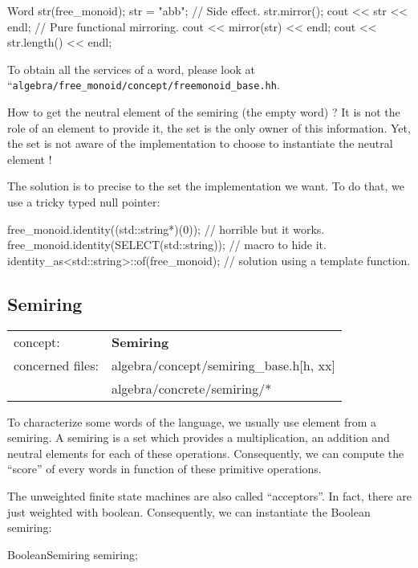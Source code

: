 \documentclass{article}
\begin{document}
\begin{code}
  Word str(free_monoid);
  str = "abb";
  // Side effect.
  str.mirror();
  cout << str << endl;
  // Pure functional mirroring.
  cout << mirror(str) << endl;
  cout << str.length() << endl;
\end{code}

To obtain all the services of a word, please look at
``\verb!algebra/free_monoid/concept/freemonoid_base.hh!.

How to get the neutral element of the semiring (the empty word) ? It
is not the role of an element to provide it, the set is the only owner
of this information. Yet, the set is not aware of the implementation
to choose to instantiate the neutral element ! 

The solution is to precise to the set the implementation we want. To
do that, we use a tricky typed null pointer:

\begin{code}
free_monoid.identity((std::string*)(0));   // horrible but it works.
free_monoid.identity(SELECT(std::string)); // macro to hide it.
identity_as<std::string>::of(free_monoid); // solution using a template function.
\end{code}

\subsection{Semiring}

\begin{tabular}%
{ll}
\hline 
concept: & \textbf{Semiring}  \\
concerned files: & algebra/concept/semiring\_base.h[h, xx] \\
                 & algebra/concrete/semiring/* \\
\hline 
\end{tabular}

To characterize some words of the language, we usually use element
from a semiring. A semiring is a set which provides a multiplication,
an addition and neutral elements for each of these operations.
Consequently, we can compute the ``score'' of every words in function of
these primitive operations.

The unweighted finite state machines are also called ``acceptors''. In
fact, there are just weighted with boolean. Consequently, we can
instantiate the Boolean semiring:

\begin{code}
BooleanSemiring semiring;
\end{code}
\end{document}
